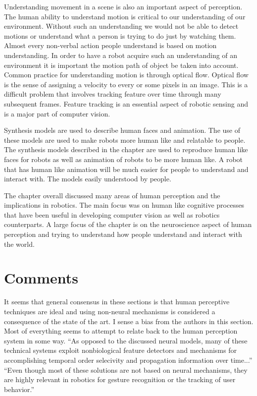 \documentclass{article}
\begin{document}
Understanding movement in a scene is also an important aspect of perception. The human ability to understand motion is critical to our understanding of our environment. Without such an understanding we would not be able to detect motions or understand what a person is trying to do just by watching them. Almost every non-verbal action people understand is based on motion understanding. In order to have a robot acquire such an understanding of an environment it is important the motion path of object be taken into account. Common practice for understanding motion is through optical flow. Optical flow is the sense of assigning a velocity to every or some pixels in an image. This is a difficult problem that involves tracking feature over time through many subsequent frames. Feature tracking is an essential aspect of robotic sensing and is a major part of computer vision.

Synthesis models are used to describe human faces and animation. The use of these models are used to make robots more human like and relatable to people. The synthesis models described in the chapter are used to reproduce human like faces for robots as well as animation of robots to be more human like. A robot that has human like animation will be much easier for people to understand and interact with. The models easily understood by people.

The chapter overall discussed many areas of human perception and the implications in robotics. The main focus was on human like cognitive processes that have been useful in developing computer vision as well as robotics counterparts. A large focus of the chapter is on the neuroscience aspect of human perception and trying to understand how people understand and interact with the world.


\section*{Comments}
It seems that general consensus in these sections is that human perceptive techniques are ideal and using non-neural mechanisms is considered a consequence of the state of the art. I sense a bias from the authors in this section. Most of everything seems to attempt to relate back to the human perception system in some way. ``As opposed to the discussed neural models, many of these technical systems exploit nonbiological feature detectors and mechanisms for accomplishing temporal order selecivity and propagation information  over time...'' ``Even though most of these solutions are not based on neural mechanisms, they are highly relevant in robotics for gesture recognition or the tracking of user behavior.''
\end{document}
